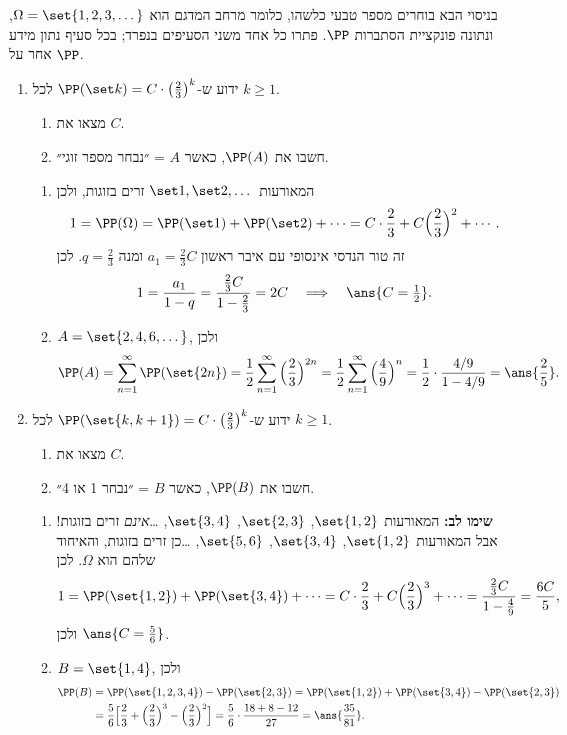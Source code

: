 בניסוי הבא בוחרים מספר טבעי כלשהו, כלומר מרחב המדגם הוא $\Omega=\set{1,2,3,\dots}$, ונתונה פונקציית הסתברות $\PP$. פתרו כל אחד משני הסעיפים בנפרד; בכל סעיף נתון מידע אחר על $\PP$.
\begin{enumerate}
\item ידוע ש-$\PP(\set k)=C\cdot\big(\frac23\big)^k$ לכל $k\ge1$.
\begin{enumerate}
\item מצאו את $C$.
\item חשבו את $\PP(A)$, כאשר $A$ = ״נבחר מספר זוגי״.
\end{enumerate}
\begin{solbox}
\begin{enumerate}
\item המאורעות $\set1,\set2,\dots$ זרים בזוגות, ולכן
\[
1=\PP(\Omega)=\PP(\set1)+\PP(\set2)+\dots=C\cdot\frac23+C\Big(\frac23\Big)^2+\cdots.
\]
זה טור הנדסי אינסופי עם איבר ראשון $a_1=\frac23C$ ומנה $q=\frac23$. לכן
\[
1=\frac{a_1}{1-q}=\frac{\frac23C}{1-\frac23}=2C\quad\Longrightarrow\quad\ans{C=\tfrac12}.
\]
\item $A=\set{2,4,6,\dots}$, ולכן
\[
\PP(A)=\sum_{n=1}^\infty\PP(\set{2n})=\frac12\sum_{n=1}^\infty\Big(\frac23\Big)^{2n}=\frac12\sum_{n=1}^\infty\Big(\frac49\Big)^n=\frac12\cdot\frac{4/9}{1-4/9}=\ans{\frac25}.
\]
\end{enumerate}
\end{solbox}
\item ידוע ש-$\PP(\set{k,k+1})=C\cdot\big(\frac23\big)^k$ לכל $k\ge1$.
\begin{enumerate}
\item מצאו את $C$.
\item חשבו את $\PP(B)$, כאשר $B$ = ״נבחר 1 או 4״.
\end{enumerate}
\begin{solbox}
\begin{enumerate}
\item \textbf{שימו לב:} המאורעות $\set{1,2}$, $\set{2,3}$, $\set{3,4}$, \dots \emph{אינם} זרים בזוגות! אבל המאורעות $\set{1,2}$, $\set{3,4}$, $\set{5,6}$, \dots כן זרים בזוגות, והאיחוד שלהם הוא $\Omega$. לכן
\[
1=\PP(\set{1,2})+\PP(\set{3,4})+\dots=C\cdot\frac23+C\Big(\frac23\Big)^3+\cdots=\frac{\frac23C}{1-\frac49}=\frac{6C}5,
\]
ולכן $\ans{C=\tfrac56}$.

\item $B=\set{1,4}$, ולכן
\[
\begin{split}
\PP(B)&=\PP(\set{1,2,3,4})-\PP(\set{2,3})=\PP(\set{1,2})+\PP(\set{3,4})-\PP(\set{2,3})\\
&=\frac56\Big[\frac23+\Big(\frac23\Big)^3-\Big(\frac23\Big)^2\Big]=\frac56\cdot\frac{18+8-12}{27}=\ans{\frac{35}{81}}.
\end{split}
\]
\end{enumerate}
\end{solbox}
\end{enumerate}
